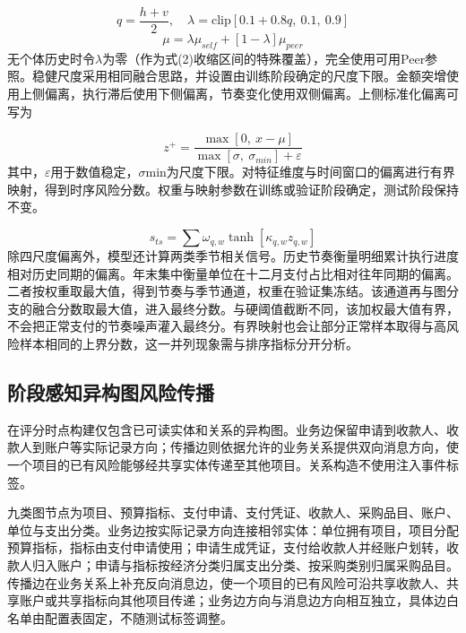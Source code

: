 \documentclass[twocolumn,11pt]{ctexart}
\begin{document}
\begin{equation}
q = \frac{h + v}{2}, \quad \lambda = \mathrm{clip}[0.1 + 0.8q,\ 0.1,\ 0.9]
\end{equation}
\begin{equation}
\mu = \lambda \mu_{self} + [1 - \lambda]\mu_{peer}
\end{equation}
无个体历史时令$\lambda$为零（作为式(2)收缩区间的特殊覆盖），完全使用可用Peer参照。稳健尺度采用相同融合思路，并设置由训练阶段确定的尺度下限。金额突增使用上侧偏离，执行滞后使用下侧偏离，节奏变化使用双侧偏离。上侧标准化偏离可写为

\begin{equation}
z^{+} = \frac{\max[0,\ x - \mu]}{\max[\sigma,\ \sigma_{min}] + \varepsilon}
\end{equation}
其中，$\varepsilon$用于数值稳定，$\sigma$min为尺度下限。对特征维度与时间窗口的偏离进行有界映射，得到时序风险分数。权重与映射参数在训练或验证阶段确定，测试阶段保持不变。

\begin{equation}
s_{ts} = \sum \omega_{q,w} \tanh[\kappa_{q,w} z_{q,w}]
\end{equation}
除四尺度偏离外，模型还计算两类季节相关信号。历史节奏衡量明细累计执行进度相对历史同期的偏离。年末集中衡量单位在十二月支付占比相对往年同期的偏离。二者按权重取最大值，得到节奏与季节通道，权重在验证集冻结。该通道再与图分支的融合分数取最大值，进入最终分数。与硬阈值截断不同，该加权最大值有界，不会把正常支付的节奏噪声灌入最终分。有界映射也会让部分正常样本取得与高风险样本相同的上界分数，这一并列现象需与排序指标分开分析。

\subsection{阶段感知异构图风险传播}
在评分时点构建仅包含已可读实体和关系的异构图。业务边保留申请到收款人、收款人到账户等实际记录方向；传播边则依据允许的业务关系提供双向消息方向，使一个项目的已有风险能够经共享实体传递至其他项目。关系构造不使用注入事件标签。

九类图节点为项目、预算指标、支付申请、支付凭证、收款人、采购品目、账户、单位与支出分类。业务边按实际记录方向连接相邻实体：单位拥有项目，项目分配预算指标，指标由支付申请使用；申请生成凭证，支付给收款人并经账户划转，收款人归入账户；申请与指标按经济分类归属支出分类、按采购类别归属采购品目。传播边在业务关系上补充反向消息边，使一个项目的已有风险可沿共享收款人、共享账户或共享指标向其他项目传递；业务边方向与消息边方向相互独立，具体边白名单由配置表固定，不随测试标签调整。
\end{document}
